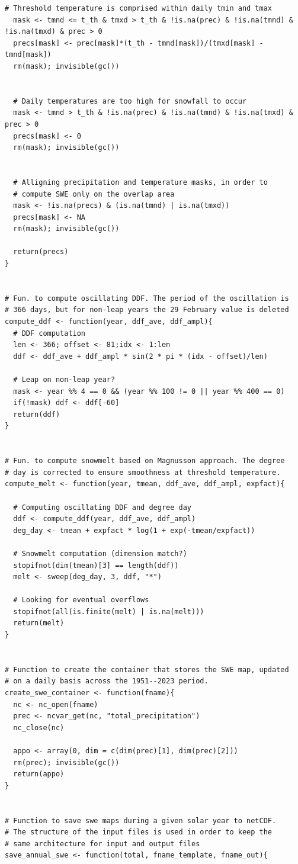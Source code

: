 \begin{lstlisting}[style=Rcode, caption={Model implementation. This code was used to generate the SWE maps.}, label={lst:swe}]
  # Threshold temperature is comprised within daily tmin and tmax
  mask <- tmnd <= t_th & tmxd > t_th & !is.na(prec) & !is.na(tmnd) & !is.na(tmxd) & prec > 0
  precs[mask] <- prec[mask]*(t_th - tmnd[mask])/(tmxd[mask] - tmnd[mask])
  rm(mask); invisible(gc())
  

  # Daily temperatures are too high for snowfall to occur
  mask <- tmnd > t_th & !is.na(prec) & !is.na(tmnd) & !is.na(tmxd) & prec > 0
  precs[mask] <- 0
  rm(mask); invisible(gc())
  
  
  # Alligning precipitation and temperature masks, in order to 
  # compute SWE only on the overlap area
  mask <- !is.na(precs) & (is.na(tmnd) | is.na(tmxd))
  precs[mask] <- NA
  rm(mask); invisible(gc())
  
  return(precs)
}


# Fun. to compute oscillating DDF. The period of the oscillation is 
# 366 days, but for non-leap years the 29 February value is deleted
compute_ddf <- function(year, ddf_ave, ddf_ampl){
  # DDF computation
  len <- 366; offset <- 81;idx <- 1:len
  ddf <- ddf_ave + ddf_ampl * sin(2 * pi * (idx - offset)/len)
  
  # Leap on non-leap year?
  mask <- year %% 4 == 0 && (year %% 100 != 0 || year %% 400 == 0)
  if(!mask) ddf <- ddf[-60]
  return(ddf)
}


# Fun. to compute snowmelt based on Magnusson approach. The degree 
# day is corrected to ensure smoothness at threshold temperature.
compute_melt <- function(year, tmean, ddf_ave, ddf_ampl, expfact){
  
  # Computing oscillating DDF and degree day
  ddf <- compute_ddf(year, ddf_ave, ddf_ampl)
  deg_day <- tmean + expfact * log(1 + exp(-tmean/expfact))
  
  # Snowmelt computation (dimension match?)
  stopifnot(dim(tmean)[3] == length(ddf))
  melt <- sweep(deg_day, 3, ddf, "*")
  
  # Looking for eventual overflows
  stopifnot(all(is.finite(melt) | is.na(melt)))
  return(melt)
}


# Function to create the container that stores the SWE map, updated 
# on a daily basis across the 1951--2023 period.
create_swe_container <- function(fname){
  nc <- nc_open(fname)
  prec <- ncvar_get(nc, "total_precipitation")
  nc_close(nc)
  
  appo <- array(0, dim = c(dim(prec)[1], dim(prec)[2]))
  rm(prec); invisible(gc())
  return(appo)
}


# Function to save swe maps during a given solar year to netCDF. 
# The structure of the input files is used in order to keep the 
# same architecture for input and output files
save_annual_swe <- function(total, fname_template, fname_out){
  

\end{lstlisting}
